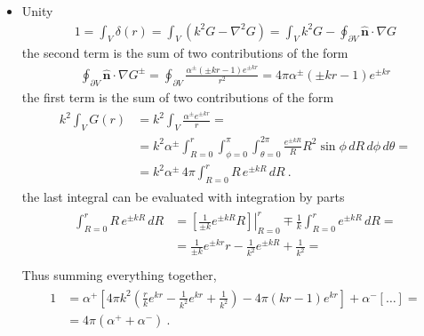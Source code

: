 \documentclass[letterpaper,10pt,english]{jupyterBook}
\begin{document}
\begin{itemize}
\item {} 
\sphinxAtStartPar
Unity
\begin{equation*}
\begin{split}1 = \int_{V} \delta(r) = \int_V \left( k^2 G - \nabla^2 G \right) = \int_V k^2 G - \oint_{\partial V} \hat{\mathbf{n}} \cdot \nabla G \end{split}
\end{equation*}
\sphinxAtStartPar
the second term is the sum of two contributions of the form
\begin{equation*}
\begin{split}\oint_{\partial V} \hat{\mathbf{n}} \cdot \nabla G^{\pm} = \oint_{\partial V} \frac{\alpha^{\pm}(\pm k r - 1) e^{\pm k r}}{r^2} = 4 \pi \alpha^{\pm} (\pm k r - 1) e^{\pm k r}\end{split}
\end{equation*}
\sphinxAtStartPar
the first term is the sum of two contributions of the form
\begin{equation*}
\begin{split}\begin{aligned}
    k^2 \int_{V} G(r)
      & = k^2 \int_{V} \frac{\alpha^{\pm} e^{\pm k r}}{r} = \\
      & = k^2 \alpha^{\pm} \int_{R = 0}^{r} \int_{\phi=0}^{\pi} \int_{\theta=0}^{2 \pi} \frac{e^{\pm k R}}{R} R^2 \sin \phi \, dR \, d \phi \, d \theta = \\
      & = k^2 \alpha^{\pm} \, 4 \pi \int_{R = 0}^{r} R \, e^{\pm k R} \, dR \ .
  \end{aligned}\end{split}
\end{equation*}
\sphinxAtStartPar
the last integral can be evaluated with integration by parts
\begin{equation*}
\begin{split}\begin{aligned}
    \int_{R = 0}^{r} R \, e^{\pm k R} \, dR
    & = \left.\left[ \frac{1}{\pm k} e^{\pm k R } R \right]\right|_{R=0}^{r} \mp \frac{1}{k} \int_{R=0}^{r} e^{\pm k R} \, dR = \\
    & = \frac{1}{\pm k} e^{\pm k r } r  - \frac{1}{k^2} e^{\pm k R} + \frac{1}{k^2} = \\
  \end{aligned}\end{split}
\end{equation*}
\sphinxAtStartPar
Thus summing everything together,
\begin{equation*}
\begin{split}\begin{aligned}
    1 & = \alpha^+ \left[ 4 \pi k^2 \left( \frac{r}{k} e^{k r} - \frac{1}{k^2} e^{kr} + \frac{1}{k^2} \right) - 4 \pi \left( k r - 1 \right) e^{kr} \right] + \alpha^- \left[ \dots \right] = \\
      & = 4 \pi \left( \alpha^+ + \alpha^- \right) \ .
  \end{aligned}\end{split}
\end{equation*}
\end{itemize}
\end{document}
